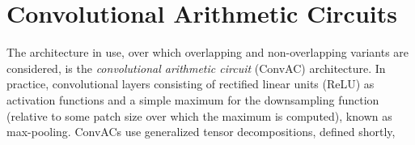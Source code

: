 \documentclass{article}
\begin{document}
\section{Convolutional Arithmetic Circuits}
The architecture in use, over which overlapping and non-overlapping variants are considered, is the \textit{convolutional arithmetic circuit} (ConvAC) architecture. In practice, convolutional layers consisting of rectified linear units (ReLU) as activation functions and a simple maximum for the downsampling function (relative to some patch size over which the maximum is computed), known as max-pooling. ConvACs use generalized tensor decompositions, defined shortly,
\end{document}
